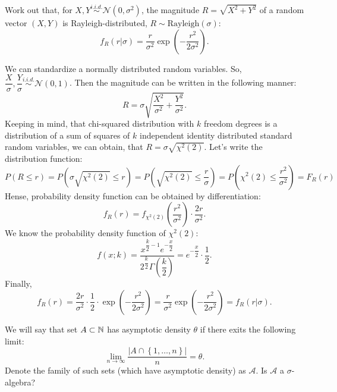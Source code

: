 \documentclass[12pt]{report}
\begin{document}
\begin{problem}{}
    Work out that, for $X, Y \overset{i.i.d.}{\sim} \mathcal{N}(0, \sigma^2)$, the magnitude $R = \sqrt{X^2 + Y^2}$ of a random vector $(X,Y)$ is Rayleigh-distributed, $R \sim \text{Rayleigh}(\sigma)$:
    \[
        f_R(r | \sigma) = \dfrac{r}{\sigma^2} \exp \left(-\dfrac{r^2}{2\sigma^2}\right).
    \] 
\end{problem}

\begin{solution}
    We can standardize a normally distributed random variables. So, $\dfrac{X}{\sigma}, \dfrac{Y}{\sigma} \overset{i.i.d.}{\sim} \mathcal{N}(0, 1)$. Then the magnitude can be written in the following manner: 
    \[
        R = \sigma \sqrt{\dfrac{X^2}{\sigma^2} + \dfrac{Y^2}{\sigma^2}}.
    \]
     Keeping in mind, that chi-squared distribution with $k$ freedom degrees is a distribution of a sum of squares of $k$ independent identity distributed standard random variables, we can obtain, that $R = \sigma\sqrt{\chi^2(2)}$. Let's write the distribution function:
     \[
        P(R \leq r) = P\left(\sigma\sqrt{\chi^2(2)} \leq r\right) = P\left(\sqrt{\chi^2(2)} \leq \dfrac{r}{\sigma}\right) = P\left(\chi^2(2) \leq \dfrac{r^2}{\sigma^2}\right) = F_R(r)
     \]
     Hense, probability density function can be obtained by differentiation:
     \[
        f_R(r) = f_{\chi^2(2)} \left(\dfrac{r^2}{\sigma^2}\right) \cdot \dfrac{2r}{\sigma^2}.
     \]
     We know the probability density function of $\chi^2(2)$:
     \[
         f(x; k) = \dfrac{\displaystyle x^{\displaystyle\dfrac{k}{2} - 1}e^{-\dfrac{x}{2}}}{\displaystyle 2^{\dfrac{k}{2}}\Gamma\left(\dfrac{k}{2}\right)} = e^{-\dfrac{x}{2}} \cdot \dfrac{1}{2}. 
     \]
     Finally,
     \[
        f_R(r) = \dfrac{2r}{\sigma^2} \cdot \dfrac{1}{2} \cdot \exp(-\dfrac{r^2}{2\sigma^2}) = \dfrac{r}{\sigma^2} \exp(-\dfrac{r^2}{2\sigma^2}) = f_R(r | \sigma).
     \]
\end{solution}

\begin{problem}{}
    We will say that set $A \subset \mathbb{N}$ has asymptotic density $\theta $ if there exits the following limit:
    \[
        \lim\limits_{n \to \infty} \dfrac{|A \cap \left\{1, \ldots, n\right\}|}{n} = \theta.  
    \]
    Denote the family of such sets (which have asymptotic density) as $\mathcal{A}$. Is $\mathcal{A}$ a $\sigma$-algebra?
\end{problem}
\end{document}
